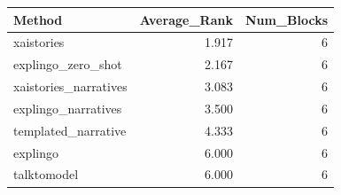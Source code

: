 \begin{tabular}{lrr}
\toprule
Method & Average_Rank & Num_Blocks \\
\midrule
xaistories & 1.917 & 6 \\
explingo_zero_shot & 2.167 & 6 \\
xaistories_narratives & 3.083 & 6 \\
explingo_narratives & 3.500 & 6 \\
templated_narrative & 4.333 & 6 \\
explingo & 6.000 & 6 \\
talktomodel & 6.000 & 6 \\
\bottomrule
\end{tabular}
